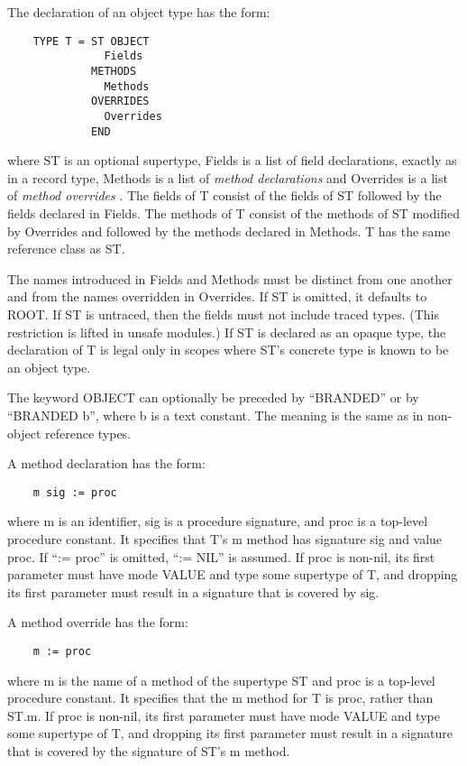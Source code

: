 \documentclass[10pt]{article}
\begin{document}
The declaration of an object type has the form:
\begin{verbatim}
    TYPE T = ST OBJECT
               Fields
             METHODS
               Methods
             OVERRIDES
               Overrides
             END
\end{verbatim}
where ST is an optional supertype, Fields is a list of field declarations,
exactly as in a record type, Methods is a list of \emph{method declarations}
and Overrides is a list of \emph{method overrides} . The fields of T consist
of the fields of ST followed by the fields declared in Fields. The methods of
T consist of the methods of ST modified by Overrides and followed by the
methods declared in Methods. T has the same reference class as ST.

The names introduced in Fields and Methods must be distinct from one another
and from the names overridden in Overrides. If ST is omitted, it defaults to
ROOT. If ST is untraced, then the fields must not include traced types. (This
restriction is lifted in unsafe modules.) If ST is declared as an opaque type,
the declaration of T is legal only in scopes where ST's concrete type is known
to be an object type.

The keyword OBJECT can optionally be preceded by ``BRANDED'' or by ``BRANDED
b'', where b is a text constant. The meaning is the same as in non-object
reference types.

A method declaration has the form:
\begin{verbatim}
    m sig := proc
\end{verbatim}
where m is an identifier, sig is a procedure signature, and proc is a
top-level procedure constant. It specifies that T's m method has signature sig
and value proc. If ``:= proc'' is omitted, ``:= NIL'' is assumed. If proc is
non-nil, its first parameter must have mode VALUE and type some supertype of
T, and dropping its first parameter must result in a signature that is covered
by sig.

A method override has the form:
\begin{verbatim}
    m := proc
\end{verbatim}
where m is the name of a method of the supertype ST and proc is a top-level
procedure constant. It specifies that the m method for T is proc, rather than
ST.m. If proc is non-nil, its first parameter must have mode VALUE and type
some supertype of T, and dropping its first parameter must result in a
signature that is covered by the signature of ST's m method.
\end{document}
